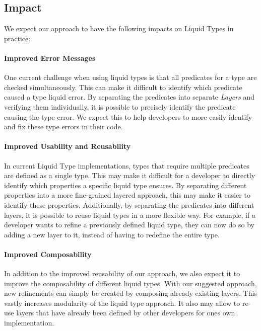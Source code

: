 \documentclass[acmsmall, review, screen]{acmart}
\begin{document}
\subsection{Impact}

We expect our approach to have the following impacts on Liquid Types in practice:

\paragraph{Improved Error Messages}

One current challenge when using liquid types is that all predicates for a type are checked simultaneously. This can make it difficult to identify which predicate caused a type liquid error. By separating the predicates into separate \textit{Layers} and verifying them individually, it is possible to precisely identify the predicate causing the type error. We expect this to help developers to more easily identify and fix these type errors in their code.

\paragraph{Improved Usability and Reusability}

In current Liquid Type implementations, types that require multiple predicates are defined as a single type. This may make it difficult for a developer to directly identify which properties a specific liquid type ensures. By separating different properties into a more fine-grained layered approach, this may make it easier to identify these properties. Additionally, by separating the predicates into different layers, it is possible to reuse liquid types in a more flexible way. For example, if a developer wants to refine a previously defined liquid type, they can now do so by adding a new layer to it, instead of having to redefine the entire type.

\paragraph{Improved Composability}

In addition to the improved reusability of our approach, we also expect it to improve the composability of different liquid types. With our suggested approach, new refinements can simply be created by composing already existing layers. This vastly increases modularity of the liquid type approach. It also may allow to re-use layers that have already been defined by other developers for ones own implementation.
\end{document}
